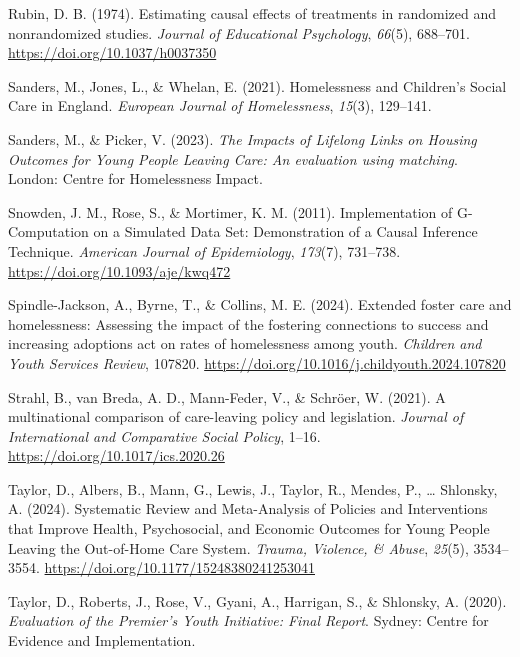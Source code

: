 \documentclass[
  jou,
  floatsintext,
  longtable,
  nolmodern,
  notxfonts,
  notimes,
  colorlinks=true,linkcolor=blue,citecolor=blue,urlcolor=blue]{apa7}
\newlength{\cslhangindent}
\newenvironment{CSLReferences}[2] %
 {\begin{list}{}{%
  \setlength{\itemindent}{0pt}
  \setlength{\leftmargin}{0pt}
  \setlength{\parsep}{0pt}
  \ifodd #1
   \setlength{\leftmargin}{\cslhangindent}
   \setlength{\itemindent}{-1\cslhangindent}
  \fi
  \setlength{\itemsep}{#2\baselineskip}}}
 {\end{list}}
\begin{document}
\begin{CSLReferences}{1}{0}
Rubin, D. B. (1974). Estimating causal effects of treatments in
randomized and nonrandomized studies. \emph{Journal of Educational
Psychology}, \emph{66}(5), 688--701.
\url{https://doi.org/10.1037/h0037350}

Sanders, M., Jones, L., \& Whelan, E. (2021). Homelessness and
{Children}'s {Social Care} in {England}. \emph{European Journal of
Homelessness}, \emph{15}(3), 129--141.

Sanders, M., \& Picker, V. (2023). \emph{The {Impacts} of {Lifelong
Links} on {Housing Outcomes} for {Young People Leaving Care}: {An}
evaluation using matching}. London: Centre for Homelessness Impact.

Snowden, J. M., Rose, S., \& Mortimer, K. M. (2011). Implementation of
{G-Computation} on a {Simulated Data Set}: {Demonstration} of a {Causal
Inference Technique}. \emph{American Journal of Epidemiology},
\emph{173}(7), 731--738. \url{https://doi.org/10.1093/aje/kwq472}

Spindle-Jackson, A., Byrne, T., \& Collins, M. E. (2024). Extended
foster care and homelessness: {Assessing} the impact of the fostering
connections to success and increasing adoptions act on rates of
homelessness among youth. \emph{Children and Youth Services Review},
107820. \url{https://doi.org/10.1016/j.childyouth.2024.107820}

Strahl, B., van Breda, A. D., Mann-Feder, V., \& Schröer, W. (2021). A
multinational comparison of care-leaving policy and legislation.
\emph{Journal of International and Comparative Social Policy}, 1--16.
\url{https://doi.org/10.1017/ics.2020.26}

Taylor, D., Albers, B., Mann, G., Lewis, J., Taylor, R., Mendes, P.,
\ldots{} Shlonsky, A. (2024). Systematic {Review} and {Meta-Analysis} of
{Policies} and {Interventions} that {Improve Health}, {Psychosocial},
and {Economic Outcomes} for {Young People Leaving} the {Out-of-Home Care
System}. \emph{Trauma, Violence, \& Abuse}, \emph{25}(5), 3534--3554.
\url{https://doi.org/10.1177/15248380241253041}

Taylor, D., Roberts, J., Rose, V., Gyani, A., Harrigan, S., \& Shlonsky,
A. (2020). \emph{Evaluation of the {Premier}'s {Youth Initiative}:
{Final Report}}. Sydney: {Centre for Evidence and Implementation}.


\end{CSLReferences}
\end{document}
